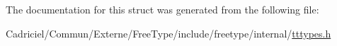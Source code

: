 The documentation for this struct was generated from the following file\-:\begin{DoxyCompactItemize}
\item 
Cadriciel/\-Commun/\-Externe/\-Free\-Type/include/freetype/internal/\hyperlink{tttypes_8h}{tttypes.\-h}\end{DoxyCompactItemize}
